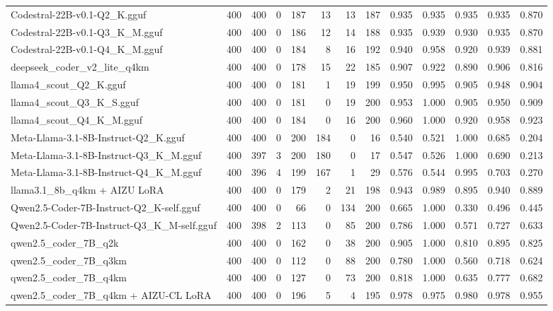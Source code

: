\begin{table}[htbp]
{\begin{tabular}{lrrrrrrrrrrrr}
    Codestral-22B-v0.1-Q2\_K.gguf & 400 & 400 & 0 & 187 & 13 & 13 & 187 & 0.935 & 0.935 & 0.935 & 0.935 & 0.870 \\
    Codestral-22B-v0.1-Q3\_K\_M.gguf & 400 & 400 & 0 & 186 & 12 & 14 & 188 & 0.935 & 0.939 & 0.930 & 0.935 & 0.870 \\
    Codestral-22B-v0.1-Q4\_K\_M.gguf & 400 & 400 & 0 & 184 & 8 & 16 & 192 & 0.940 & 0.958 & 0.920 & 0.939 & 0.881 \\
    deepseek\_coder\_v2\_lite\_q4km & 400 & 400 & 0 & 178 & 15 & 22 & 185 & 0.907 & 0.922 & 0.890 & 0.906 & 0.816 \\
    llama4\_scout\_Q2\_K.gguf & 400 & 400 & 0 & 181 & 1 & 19 & 199 & 0.950 & 0.995 & 0.905 & 0.948 & 0.904 \\
    llama4\_scout\_Q3\_K\_S.gguf & 400 & 400 & 0 & 181 & 0 & 19 & 200 & 0.953 & 1.000 & 0.905 & 0.950 & 0.909 \\
    llama4\_scout\_Q4\_K\_M.gguf & 400 & 400 & 0 & 184 & 0 & 16 & 200 & 0.960 & 1.000 & 0.920 & 0.958 & 0.923 \\
    Meta-Llama-3.1-8B-Instruct-Q2\_K.gguf & 400 & 400 & 0 & 200 & 184 & 0 & 16 & 0.540 & 0.521 & 1.000 & 0.685 & 0.204 \\
    Meta-Llama-3.1-8B-Instruct-Q3\_K\_M.gguf & 400 & 397 & 3 & 200 & 180 & 0 & 17 & 0.547 & 0.526 & 1.000 & 0.690 & 0.213 \\
    Meta-Llama-3.1-8B-Instruct-Q4\_K\_M.gguf & 400 & 396 & 4 & 199 & 167 & 1 & 29 & 0.576 & 0.544 & 0.995 & 0.703 & 0.270 \\
    llama3.1\_8b\_q4km + AIZU LoRA & 400 & 400 & 0 & 179 & 2 & 21 & 198 & 0.943 & 0.989 & 0.895 & 0.940 & 0.889 \\
    Qwen2.5-Coder-7B-Instruct-Q2\_K-self.gguf & 400 & 400 & 0 & 66 & 0 & 134 & 200 & 0.665 & 1.000 & 0.330 & 0.496 & 0.445 \\
    Qwen2.5-Coder-7B-Instruct-Q3\_K\_M-self.gguf & 400 & 398 & 2 & 113 & 0 & 85 & 200 & 0.786 & 1.000 & 0.571 & 0.727 & 0.633 \\
    qwen2.5\_coder\_7B\_q2k & 400 & 400 & 0 & 162 & 0 & 38 & 200 & 0.905 & 1.000 & 0.810 & 0.895 & 0.825 \\
    qwen2.5\_coder\_7B\_q3km & 400 & 400 & 0 & 112 & 0 & 88 & 200 & 0.780 & 1.000 & 0.560 & 0.718 & 0.624 \\
    qwen2.5\_coder\_7B\_q4km & 400 & 400 & 0 & 127 & 0 & 73 & 200 & 0.818 & 1.000 & 0.635 & 0.777 & 0.682 \\
    qwen2.5\_coder\_7B\_q4km + AIZU-CL LoRA & 400 & 400 & 0 & 196 & 5 & 4 & 195 & 0.978 & 0.975 & 0.980 & 0.978 & \cellcolor{green!40}0.955 \\

\end{tabular}}
\end{table}
